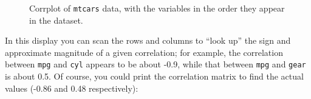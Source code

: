 \documentclass[
  letterpaper,
  10pt,
  krantz2]{krantz}
\begin{document}
\begin{figure}[H]


\caption{\label{fig-mtcars-corrplot-varorder}Corrplot of \texttt{mtcars}
data, with the variables in the order they appear in the dataset.}

\end{figure}%

In this display you can scan the rows and columns to ``look up'' the
sign and approximate magnitude of a given correlation; for example, the
correlation between \texttt{mpg} and \texttt{cyl} appears to be about
-0.9, while that between \texttt{mpg} and \texttt{gear} is about 0.5. Of
course, you could print the correlation matrix to find the actual values
(-0.86 and 0.48 respectively):
\end{document}
